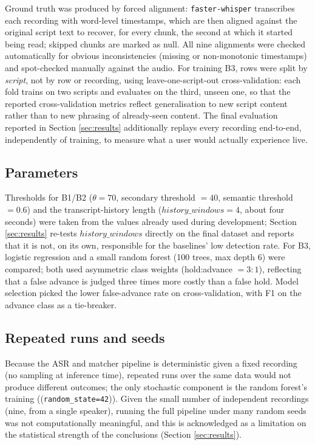 \documentclass[conference,a4paper]{IEEEtran}
\begin{document}
Ground truth was produced by forced alignment: \texttt{faster-whisper} transcribes each recording with word-level timestamps, which are then aligned against the original script text to recover, for every chunk, the second at which it started being read; skipped chunks are marked as null. All nine alignments were checked automatically for obvious inconsistencies (missing or non-monotonic timestamps) and spot-checked manually against the audio. For training B3, rows were split by \emph{script}, not by row or recording, using leave-one-script-out cross-validation: each fold trains on two scripts and evaluates on the third, unseen one, so that the reported cross-validation metrics reflect generalisation to new script content rather than to new phrasing of already-seen content. The final evaluation reported in Section \ref{sec:results} additionally replays every recording end-to-end, independently of training, to measure what a user would actually experience live.

\subsection{Parameters}
Thresholds for B1/B2 (\(\theta=70\), secondary threshold \(=40\), semantic threshold \(=0.6\)) and the transcript-history length (\(history\_windows=4\), about four seconds) were taken from the values already used during development; Section \ref{sec:results} re-tests \(history\_windows\) directly on the final dataset and reports that it is not, on its own, responsible for the baselines' low detection rate. For B3, logistic regression and a small random forest (100 trees, max depth 6) were compared; both used asymmetric class weights (hold:advance \(=3:1\)), reflecting that a false advance is judged three times more costly than a false hold. Model selection picked the lower false-advance rate on cross-validation, with F1 on the advance class as a tie-breaker.

\subsection{Repeated runs and seeds}
Because the ASR and matcher pipeline is deterministic given a fixed recording (no sampling at inference time), repeated runs over the same data would not produce different outcomes; the only stochastic component is the random forest's training ((\texttt{random\_state=42})). Given the small number of independent recordings (nine, from a single speaker), running the full pipeline under many random seeds was not computationally meaningful, and this is acknowledged as a limitation on the statistical strength of the conclusions (Section \ref{sec:results}).
\end{document}
